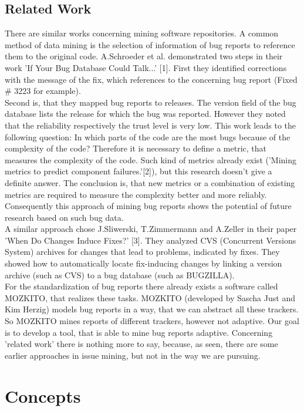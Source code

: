 \section{Related Work}
\label{Related Work}
There are similar works concerning mining software repositories. A common method of data mining is the selection of information of bug reports to reference them to the original code. A.Schroeder et al. demonstrated two steps in their work 'If Your Bug Database Could Talk...' [1]. First they identified corrections with the message of the fix, which references to the concerning bug report (Fixed \# 3223 for example).\\ Second is, that they mapped bug reports to releases. The version field of the bug database lists the release for which the bug was reported. However they noted that the reliability respectively the trust level is very low. This work leads to the following question: In which parts of the code are the most bugs because of the complexity of the code? Therefore it is necessary to define a metric, that measures the complexity of the code. Such kind of metrics already exist ('Mining metrics to predict
component failures.'[2]), but this research doesn't give a definite answer. The conclusion is, that new metrics or a combination of existing metrics are required to measure the complexity better and more reliably. Consequently this approach of mining bug reports shows the potential of future research based on such bug data.\\ A similar approach chose J.Sliwerski, T.Zimmermann and A.Zeller in their paper 'When Do Changes Induce Fixes?' [3]. They analyzed CVS (Concurrent Versions System) archives for changes that lead to problems, indicated by fixes. They showed how to automatically locate fix-inducing changes by linking a version archive (such as CVS) to a bug database (such as BUGZILLA).\\ 
For the standardization of bug reports there already exists a software called MOZKITO, that realizes these tasks. MOZKITO (developed by Sascha Just and Kim Herzig) models bug reports in a way, that we can abstract all these trackers. So MOZKITO mines reports of different trackers, however not adaptive. Our goal is to develop a tool, that is able to mine bug reports adaptive. Concerning 'related work' there is nothing more to say, because, as seen, there are some earlier approaches in issue mining, but not in the way we are pursuing. 
\chapter{Concepts}
\label{Concepts}

